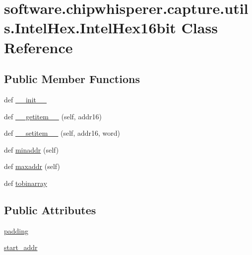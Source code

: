 \hypertarget{classsoftware_1_1chipwhisperer_1_1capture_1_1utils_1_1IntelHex_1_1IntelHex16bit}{}\section{software.\+chipwhisperer.\+capture.\+utils.\+Intel\+Hex.\+Intel\+Hex16bit Class Reference}
\label{classsoftware_1_1chipwhisperer_1_1capture_1_1utils_1_1IntelHex_1_1IntelHex16bit}
\subsection*{Public Member Functions}
\begin{DoxyCompactItemize}
\item 
def \hyperlink{classsoftware_1_1chipwhisperer_1_1capture_1_1utils_1_1IntelHex_1_1IntelHex16bit_a9fcb7ef259b84001f1472e5c1f8c3320}{\+\_\+\+\_\+init\+\_\+\+\_\+}
\item 
def \hyperlink{classsoftware_1_1chipwhisperer_1_1capture_1_1utils_1_1IntelHex_1_1IntelHex16bit_a6191fad4d1f41165b62af2924c8ff00f}{\+\_\+\+\_\+getitem\+\_\+\+\_\+} (self, addr16)
\item 
def \hyperlink{classsoftware_1_1chipwhisperer_1_1capture_1_1utils_1_1IntelHex_1_1IntelHex16bit_ae8ef150348091907446d2d07bf0b8297}{\+\_\+\+\_\+setitem\+\_\+\+\_\+} (self, addr16, word)
\item 
def \hyperlink{classsoftware_1_1chipwhisperer_1_1capture_1_1utils_1_1IntelHex_1_1IntelHex16bit_a25f1d62285eaf06217cb691a4c80b216}{minaddr} (self)
\item 
def \hyperlink{classsoftware_1_1chipwhisperer_1_1capture_1_1utils_1_1IntelHex_1_1IntelHex16bit_aa9e3d3f7ed6652a80d4169716300d5a2}{maxaddr} (self)
\item 
def \hyperlink{classsoftware_1_1chipwhisperer_1_1capture_1_1utils_1_1IntelHex_1_1IntelHex16bit_aaeaa6a3ba064f3574d752309cefc1633}{tobinarray}
\end{DoxyCompactItemize}
\subsection*{Public Attributes}
\begin{DoxyCompactItemize}
\item 
\hyperlink{classsoftware_1_1chipwhisperer_1_1capture_1_1utils_1_1IntelHex_1_1IntelHex16bit_a8c2c4cd2080774693d8fb6916e15c289}{padding}
\item 
\hyperlink{classsoftware_1_1chipwhisperer_1_1capture_1_1utils_1_1IntelHex_1_1IntelHex16bit_a3e59336acca1f0eb76aedf92df1c1a4e}{start\+\_\+addr}
\end{DoxyCompactItemize}
